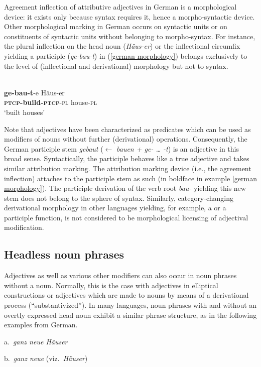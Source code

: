 Agreement inflection of attributive adjectives in German is a morphological device: it exists only because syntax requires it,  hence a morpho-syntactic device. Other morphological marking in German occurs on syntactic units or on constituents of syntactic units without belonging to morpho-syntax. For instance, the plural inflection on the head noun (\textit{Häus-er}) or the inflectional circumfix yielding a participle (\textit{ge-bau-t}) in (\ref{german morphology}) belongs exclusively to the level of (inflectional and derivational) morphology but not to syntax.

\ea
\label{german morphology}
\\
\gll	\textbf{ge-bau-t}-e Häus-er\\
	\textbf{\textsc{ptcp}-build-\textsc{ptcp}}-\textsc{pl} house-\textsc{pl}\\
\glt	‘built houses’
\z

Note that adjectives have been characterized as predicates which can be used as modifiers of nouns without further (derivational) operations. Consequently, the German participle stem \textit{gebaut} ($\leftarrow$ \textit{bauen + ge- … -t}) is an adjective in this broad sense. Syntactically, the participle behaves like a true adjective and takes similar attribution marking. The attribution marking device (i.e., the agreement inflection) attaches to the participle stem as such (in boldface in example \ref{german morphology}). The participle derivation of the verb root \textit{bau-} yielding this new stem does not belong to the sphere of syntax. Similarly, category-changing derivational morphology in other languages yielding, for example, a  or a participle function, is not considered to be morphological licensing of adjectival modification.

\subsection{Headless noun phrases}
Adjectives as well as various other modifiers can also occur in noun phrases without a noun. Normally, this is the case with adjectives in elliptical constructions or adjectives which are made to nouns by means of a derivational process (“substantivized”). In many languages, noun phrases with and without an overtly expressed head noun exhibit a similar phrase structure, as in the following examples from German.
\ea
\label{germ headhadless}
\\
\z
\parbox[t]{2.4in}{a.~\textit{ganz neue Häuser}}
\parbox[t]{2.3in}{b.~\textit{ganz neue} (viz.~\textit{Häuser})}\\

